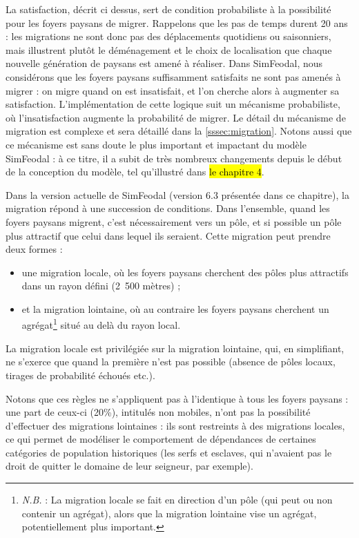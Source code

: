 La satisfaction, décrit ci dessus, sert de condition probabiliste à la possibilité pour les foyers paysans de migrer.
Rappelons que les pas de temps durent 20 ans : les migrations ne sont donc pas des déplacements quotidiens ou saisonniers, mais illustrent plutôt le déménagement et le choix de localisation que chaque nouvelle génération de paysans est amené à réaliser.
Dans SimFeodal, nous considérons que les foyers paysans suffisamment satisfaits ne sont pas amenés à migrer : on migre quand on est insatisfait, et l'on cherche alors à augmenter sa satisfaction.
L'implémentation de cette logique suit un mécanisme probabiliste, où l'insatisfaction augmente la probabilité de migrer.
Le détail du mécanisme de migration est complexe et sera détaillé dans la \cref{sssec:migration}.
Notons aussi que ce mécanisme est sans doute le plus important et impactant du modèle SimFeodal : à ce titre, il a subit de très nombreux changements depuis le début de la conception du modèle, tel qu'illustré dans \hl{le chapitre 4}.

Dans la version actuelle de SimFeodal (version 6.3 présentée dans ce chapitre), la migration répond à une succession de conditions.
Dans l'ensemble, quand les foyers paysans migrent, c'est nécessairement vers un pôle, et si possible un pôle plus attractif que celui dans lequel ils seraient.
Cette migration peut prendre deux formes :
\begin{itemize}
	\item une migration \og locale\fg{}, où les foyers paysans cherchent des pôles plus attractifs dans un rayon défini (2~500 mètres) ;
	\item et la migration \og lointaine\fg{}, où au contraire les foyers paysans cherchent un agrégat\footnote{
		\textit{N.B.} : La migration locale se fait en direction d'un pôle (qui peut ou non contenir un agrégat), alors que la migration lointaine vise un agrégat, potentiellement plus important.
	} situé au delà du rayon local.
\end{itemize} 
La migration locale est privilégiée sur la migration lointaine, qui, en simplifiant, ne s'exerce que quand la première n'est pas possible (absence de pôles locaux, tirages de probabilité échoués etc.).

Notons que ces règles ne s'appliquent pas à l'identique à tous les foyers paysans : une part de ceux-ci (20\%), intitulés \og non mobiles\fg{}, n'ont pas la possibilité d'effectuer des migrations lointaines : ils sont restreints à des migrations locales, ce qui permet de modéliser le comportement de dépendances de certaines catégories de population historiques (les serfs et esclaves, qui n'avaient pas le droit de quitter le domaine de leur seigneur, par exemple).


